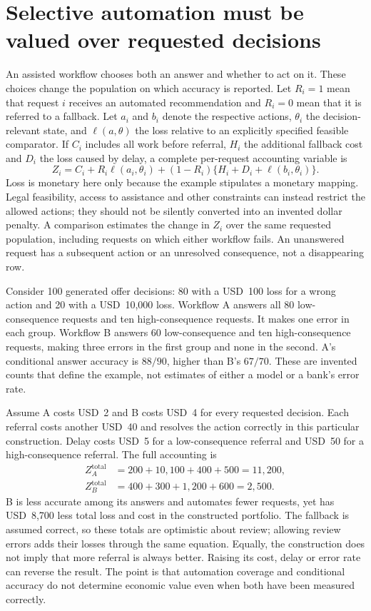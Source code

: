 \section{Selective automation must be valued over requested decisions}
\label{exec14:l8-development}

An assisted workflow chooses both an answer and whether to act on it. These
choices change the population on which accuracy is reported. Let $R_i=1$ mean
that request $i$ receives an automated recommendation and $R_i=0$ mean that it
is referred to a fallback. Let $a_i$ and $b_i$ denote the respective actions,
$\theta_i$ the decision-relevant state, and $\ell(a,\theta)$ the loss relative
to an explicitly specified feasible comparator. If $C_i$ includes all work
before referral, $H_i$ the additional fallback cost and $D_i$ the loss caused
by delay, a complete per-request accounting variable is
\[
 Z_i=C_i+R_i\ell(a_i,\theta_i)
       +(1-R_i)\{H_i+D_i+\ell(b_i,\theta_i)\}.
\]
Loss is monetary here only because the example stipulates a monetary mapping.
Legal feasibility, access to assistance and other constraints can instead
restrict the allowed actions; they should not be silently converted into an
invented dollar penalty. A comparison estimates the change in $Z_i$ over the
same requested population, including requests on which either workflow fails.
An unanswered request has a subsequent action or an unresolved consequence,
not a disappearing row. \citep{exec14_l8_economics}

Consider 100 generated offer decisions: 80 with a USD~100 loss for a wrong
action and 20 with a USD~10,000 loss. Workflow A answers all 80 low-consequence
requests and ten high-consequence requests. It makes one error in each group.
Workflow B answers 60 low-consequence and ten high-consequence requests, making
three errors in the first group and none in the second. A's conditional answer
accuracy is $88/90$, higher than B's $67/70$. These are invented counts that
define the example, not estimates of either a model or a bank's error rate.

Assume A costs USD~2 and B costs USD~4 for every requested decision. Each
referral costs another USD~40 and resolves the action correctly in this
particular construction. Delay costs USD~5 for a low-consequence referral and
USD~50 for a high-consequence referral. The full accounting is
\[
 \begin{aligned}
 Z_A^{\mathrm{total}}&=200+10{,}100+400+500=11{,}200,\\
 Z_B^{\mathrm{total}}&=400+300+1{,}200+600=2{,}500.
 \end{aligned}
\]
B is less accurate among its answers and automates fewer requests, yet has
USD~8,700 less total loss and cost in the constructed portfolio. The fallback
is assumed correct, so these totals are optimistic about review; allowing
review errors adds their losses through the same equation. Equally, the
construction does not imply that more referral is always better. Raising its
cost, delay or error rate can reverse the result. The point is that automation
coverage and conditional accuracy do not determine economic value even when
both have been measured correctly. \citep{exec14_l8_economics}

